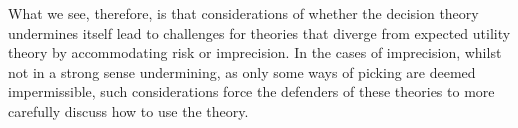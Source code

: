 \documentclass[a4paper]{article}
\newcommand\A{\mathcal{A}}
\newcommand\Exp{\mathsf{Exp}}
\newcommand\EU{\mathrm{EU}}
\newcommand\ut{u}
\newcommand\s{\mathsf{s}}
\newcommand\SetDelimiter[1][]{
	\nonscript\,#1\vert \allowbreak \nonscript\,\mathopen{}}
\providecommand\given{\SetDelimiter}
\renewcommand{\leq}{\leqslant}
\newenvironment{CCM rewritten}
{\begingroup\color{blue}} %
{\endgroup}              %
\begin{document}
	What we see, therefore, is that considerations of whether the decision theory undermines itself lead to challenges for theories that diverge from expected utility theory by accommodating risk or imprecision. In the cases of imprecision, whilst not in a strong sense undermining, as only some ways of picking are deemed impermissible, such considerations force the defenders of these theories to more carefully discuss how to use the theory. 
	





\end{document}
